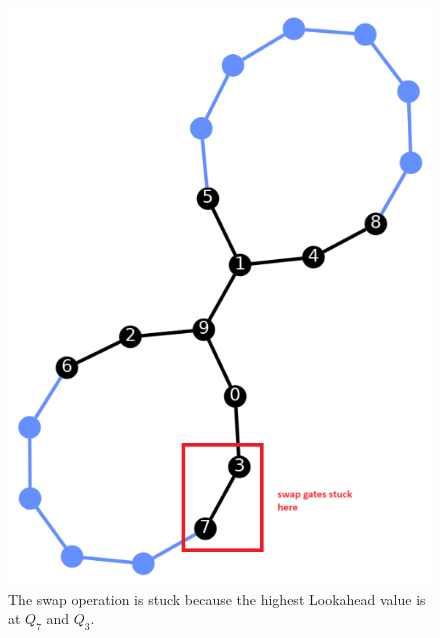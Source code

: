 \begin{figure}
    \centering
    \includegraphics[width=0.5\linewidth]{image/swap_stuck.png}
    \caption{The swap operation is stuck because the highest Lookahead value is at $Q_7$ and $Q_3$.}
    \label{fig:swap-stuck}
\end{figure}

